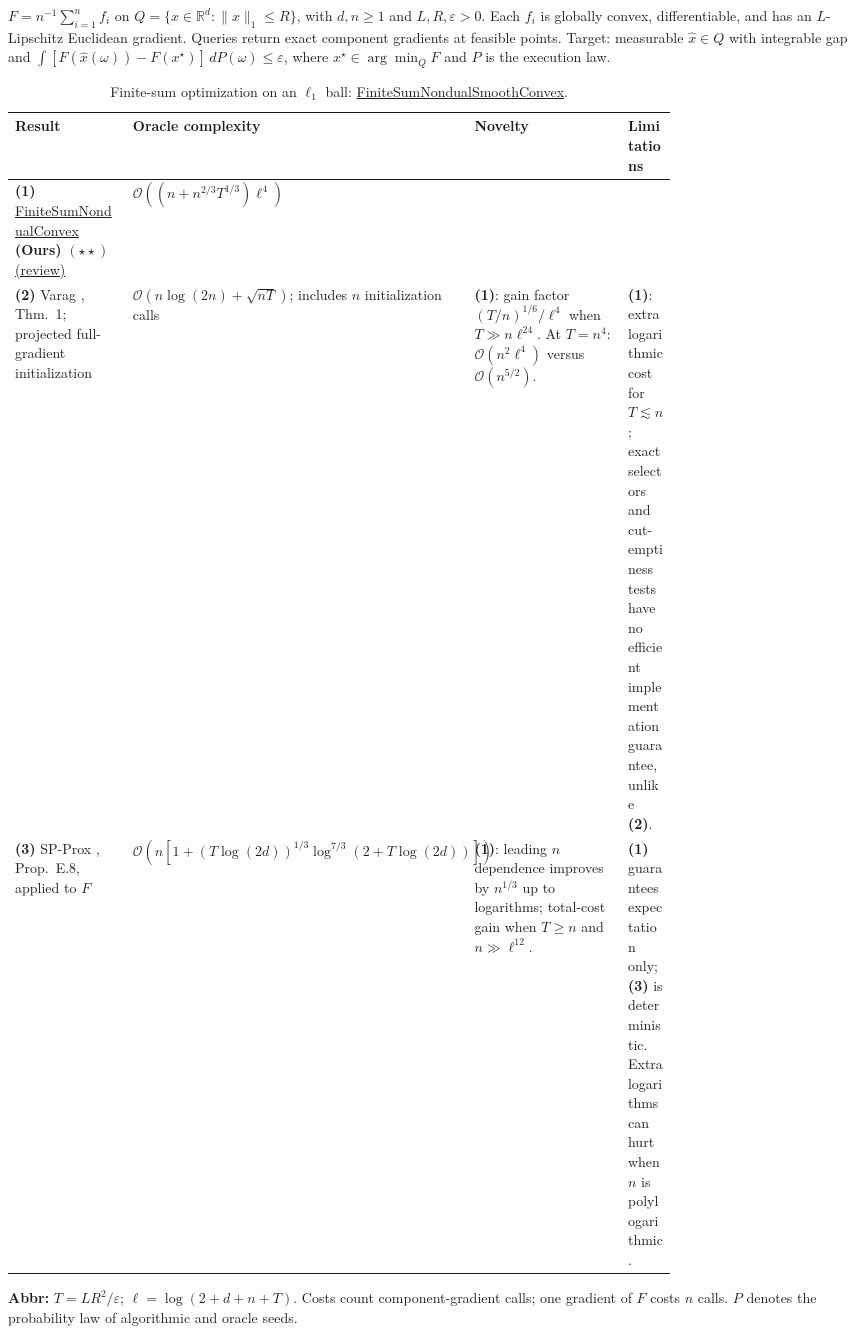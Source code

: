 \begin{table}[tp]
\centering
\caption{Finite-sum optimization on an $\ell_1$ ball: \href{https://github.com/k3nfalt/longtails/blob/main/LongTails/Setups/FiniteSumNondualSmoothConvex.lean}{FiniteSumNondualSmoothConvex}.}\label{tab:FiniteSumNondualSmoothConvex}
\parbox{\linewidth}{\footnotesize $F=n^{-1}\sum_{i=1}^n f_i$ on $Q=\{x\in\mathbb R^d:\|x\|_1\le R\}$, with $d,n\ge1$ and $L,R,\varepsilon>0$. Each $f_i$ is globally convex, differentiable, and has an $L$-Lipschitz Euclidean gradient. Queries return exact component gradients at feasible points. Target: measurable $\hat x\in Q$ with integrable gap and $\int [F(\hat x(\omega))-F(x^\star)]\,dP(\omega)\le\varepsilon$, where $x^\star\in\arg\min_Q F$ and $P$ is the execution law.}\par\smallskip
\begin{threeparttable}
\footnotesize
\setlength{\tabcolsep}{4pt}\renewcommand{\arraystretch}{1.25}
\begin{tabularx}{\linewidth}{@{}>{\raggedright\arraybackslash}p{0.20\linewidth}>{\raggedright\arraybackslash}p{0.32\linewidth}>{\raggedright\arraybackslash}p{0.25\linewidth}>{\raggedright\arraybackslash}X@{}}
\toprule
\textbf{Result} & \textbf{Oracle complexity} & \textbf{Novelty} & \textbf{Limitations} \\
\midrule
\textbf{(1)} \href{https://github.com/k3nfalt/longtails/blob/main/LongTails/Theorems/FiniteSumNondualConvex.lean}{Finite\allowbreak Sum\allowbreak Nondual\allowbreak Convex} \textbf{(Ours)} $(\star\star)$ \href{https://github.com/k3nfalt/longtails/blob/main/scripts/reviews/FiniteSumNondualConvex.md}{(review)} & $\mathcal{O}((n+n^{2/3}T^{1/3})\ell^4)$ & & \\
\midrule[1.2pt]
\textbf{(2)} Varag \citep{fsndLan2019v3}, Thm.~1; projected full-gradient initialization & $\mathcal{O}(n\log(2n)+\sqrt{nT})$; includes $n$ initialization calls & \textbf{(1)}: gain factor $(T/n)^{1/6}/\ell^4$ when $T\gg n\ell^{24}$. At $T=n^4$: $\mathcal{O}(n^2\ell^4)$ versus $\mathcal{O}(n^{5/2})$. & \textbf{(1)}: extra logarithmic cost for $T\lesssim n$; exact selectors and cut-emptiness tests have no efficient implementation guarantee, unlike \textbf{(2)}. \\
\midrule
\textbf{(3)} SP-Prox \citep{fsndLoginov2026v1}, Prop.~E.8, applied to $F$ & $\mathcal{O}\!\left(n\left[1+(T\log(2d))^{1/3}\log^{7/3}(2+T\log(2d))\right]\right)$ & \textbf{(1)}: leading $n$ dependence improves by $n^{1/3}$ up to logarithms; total-cost gain when $T\ge n$ and $n\gg\ell^{12}$. & \textbf{(1)} guarantees expectation only; \textbf{(3)} is deterministic. Extra logarithms can hurt when $n$ is polylogarithmic. \\
\bottomrule
\end{tabularx}
\begin{tablenotes}[flushleft]\footnotesize
\item[] \textbf{Abbr:} $T=LR^2/\varepsilon$; $\ell=\log(2+d+n+T)$. Costs count component-gradient calls; one gradient of $F$ costs $n$ calls. $P$ denotes the probability law of algorithmic and oracle seeds.
\end{tablenotes}
\end{threeparttable}
\end{table}
\clearpage
